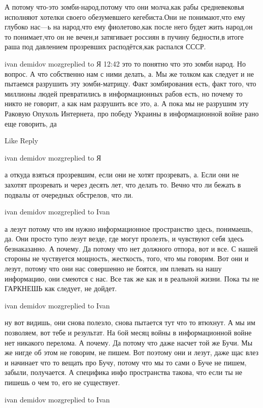 А потому что-это зомби-народ,потому что они молча,как рабы средневековья
исполняют хотелки своего обезумевшего кегебиста.Они не понимают,что ему глубоко
нас---ь на народ,что ему фиолетово,как после него будет жить народ,он то
понимает,что он не вечен,и затягивает россиян в пучину бедности,в итоге раша
под давлением прозревших расподётся,как распался СССР.


ivan demidov mozgreplied to Я
12:42
это то понятно что это зомби народ. Но вопрос. А что собственно нам с ними делать, а. Мы же толком как следует и не пытаемся разрушить эту зомби-матрицу. Факт зомбирования есть, факт того, что миллионы людей превратились в информационных рабов есть, но почему то никто не говорит, а как нам разрушить все это, а. А пока мы не разрушим эту Раковую Опухоль Интернета, про победу Украины в информационной войне рано еще говорить, да

    Like
    Reply

ivan demidov mozgreplied to Я

а откуда взяться прозревшим, если они не хотят прозревать, а. Если они не
захотят прозревать и через десять лет, что делать то. Вечно что ли бежать в
подвалы от очередных обстрелов, что ли.

ivan demidov mozgreplied to Ivan

а лезут потому что им нужно информационное пространство здесь, понимаешь, да.
Они просто тупо лезут везде, где могут пролезть, и чувствуют себя здесь
безнаказанно. А почему. Да потому что нет должного отпора, вот и все. С нашей
стороны не чуствуется мощность, жесткость, того, что мы говорим. Вот они и
лезут, потому что они нас совершенно не боятся, им плевать на нашу информацию,
они смеются с нас. Все так же как и в реальной жизни. Пока ты не ГАРКНЕШЬ как
следует, не дойдет.

ivan demidov mozgreplied to Ivan

ну вот видишь, они снова полезло, снова пытается тут что то втюхнут. А мы им
позволяем, вот тебе и результат. На 6ой месяц войны в информационной войне нет
никакого перелома. А почему. Да потому что даже насчет той же Бучи. Мы же нигде
об этом не говорим, не пишем. Вот поэтому они и лезут, даже щас влез и начинает
что то вещать про Бучу, потому что мы то сами о Буче не пишем, забыли,
получается. А специфика инфо пространства такова, что если ты не пишешь о чем
то, его не существует.

ivan demidov mozgreplied to Ivan

